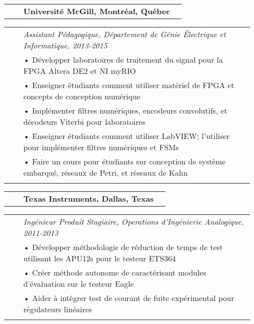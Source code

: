 \documentclass{minimal}
\begin{document}
\begin{tabular}{ p{1.5cm} p{1cm} p{10cm} >{\raggedleft\arraybackslash}p{3cm} }
& & \textbf{Université McGill, Montréal, Québec} & \\
\end{tabular}

\begin{tabular}{ p{1.5cm} p{1cm} p{16cm} }
& & \textit{Assistant Pédagogique, Département de Génie Électrique et Informatique, 2013-2015}\\
& & • Développer laboratoires de traitement du signal pour la FPGA Altera DE2 et NI myRIO\\
& & • Enseigner étudiants comment utiliser matériel de FPGA et concepts de conception numérique\\ 
& & • Implémenter filtres numériques, encodeurs convolutifs, et décodeurs Viterbi pour laboratoires\\
& & • Enseigner étudiants comment utiliser LabVIEW; l'utiliser pour implémenter filtres numériques et FSMs\\
& & • Faire un cours pour étudiants sur conception de système embarqué, réseaux de Petri, et réseaux de Kahn\\
& & \\
\end{tabular}

\pagebreak

\begin{tabular}{ p{1.5cm} p{1cm} p{10cm} >{\raggedleft\arraybackslash}p{3cm} }
& & \textbf{Texas Instruments, Dallas, Texas} & \\
\end{tabular}

\begin{tabular}{ p{1.5cm} p{1cm} p{16cm} }
& & \textit{Ingénieur Produit Stagiaire, Operations d'Ingénierie Analogique, 2011-2013}\\
& & • Développer méthodologie de réduction de temps de test utilisant les APU12s pour le testeur ETS364\\
& & • Créer méthode autonome de caractérisant modules d'évaluation sur le testeur Eagle\\
& & • Aider à intégrer test de courant de fuite expérimental pour régulateurs linéaires\\
& & \\
\end{tabular}
\end{document}
